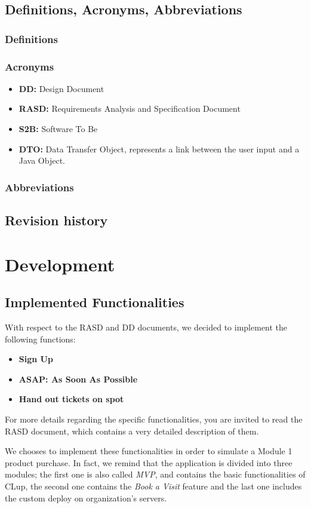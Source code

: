 \documentclass[table, 12pt]{article}
\begin{document}
\subsection{Definitions, Acronyms, Abbreviations}
\subsubsection{Definitions}
\subsubsection{Acronyms}
\begin{itemize}
    \item \textbf{DD:} Design Document
    \item \textbf{RASD:} Requirements Analysis and Specification Document
    \item \textbf{S2B:} Software To Be
    \item \textbf{DTO:} Data Transfer Object, represents a link between the user input and a Java Object.
\end{itemize}
\subsubsection{Abbreviations}
\subsection{Revision history}

\newpage
\section{Development}
\subsection{Implemented Functionalities}
With respect to the RASD and DD documents, we decided to implement the following functions:
\begin{itemize}
    \item \textbf{Sign Up}
    \item \textbf{ASAP: As Soon As Possible}
    \item \textbf{Hand out tickets on spot}
\end{itemize}
For more details regarding the specific functionalities, you are invited to read the RASD document, which contains a very detailed description of them.

We chooses to implement these functionalities in order to simulate a Module 1 product purchase. In fact, we remind that the application is divided into three modules; the first one is also called \textit{MVP}, and contains the basic functionalities of CLup, the second one contains the \textit{Book a Visit} feature and the last one includes the custom deploy on organization's servers.
\end{document}
